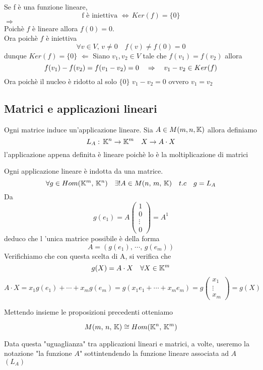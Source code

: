 \begin{prop} Se f è una funzione lineare, $$ \text{f è iniettiva }\Leftrightarrow \, Ker (f)=\{ 0 \}$$
\proof $\Rightarrow $ \\ 
Poich\`e $f$ \`e lineare allora $ f(0)= 0 $.\\
Ora poich\`e $f$ \`e   iniettiva 
$$\forall v \in V, \, v \neq 0 \quad f(v)\neq f(0)= 0$$ 
dunque $Ker(f) = \{ 0 \}$ 
$\Leftarrow $ Siano $v_1, v_2 \in V $ tale che $f(v_1)=f(v_2)$ allora 
$$ f(v_1) - f(v_2)=f(v_1-v_2)=0 \quad \Rightarrow \quad v_1-v_2 \in Ker (f)$$
Ora poich\`e il nucleo \`e ridotto al solo $\{0\}$ $v_1-v_2=0 $ ovvero $v_1=v_2$
\endproof
\end{prop}

\subsection{Matrici e applicazioni lineari}\label{Matrici_Come_Lineari}
\begin{prop}
Ogni matrice induce un'applicazione lineare.
\proof
Sia $ A \in M(m,n,\mathbb{K} ) $ allora definiamo 
$$ L_A:\, \mathbb{K} ^ n \to \mathbb{K} ^  m \quad X \to A \cdot X $$ 
l'applicazione appena definita \`e lineare poich\`e lo \`e la moltiplicazione di matrici 
\endproof
\end{prop}

\begin{prop} Ogni applicazione lineare \`e indotta da una matrice. 
$$ \forall g \in Hom ( \mathbb{K}^ m , \, \mathbb{K} ^ n  ) \quad \exists ! A \in M( n,\, m ,\, \mathbb{K} ) \quad t.c \quad g=L_A$$
\proof
Da 
$$ g(e_1) = A \begin{pmatrix}
1 \\ 0 \\ \vdots \\ 0 
\end{pmatrix} = A^1 $$ 
deduco che l 'unica matrice possibile \`e  della forma 
 $$ A = ( g( e_1 ) , \, \cdots , \, g ( e_m )) $$
 Verifichiamo che con questa scelta di A, si verifica che $$ g(X)= A \cdot X  \quad \forall X \in \mathbb{K} ^ m $$
 $$ A \cdot X = x_1 g( e_1 ) + \cdots + x_m g( e_m ) = g ( x_1 e_1 + \cdots + x_m e_m ) = g \begin{pmatrix}
 x_1 \\ \vdots \\ x_m 
 \end{pmatrix}= g(X)
 $$ 
 \endproof
\end{prop}
Mettendo insieme le proposizioni precedenti otteniamo
\begin{prop} $$ M ( m ,\, n ,\, \mathbb{K} ) \cong Hom ( \mathbb{K} ^ n , \, \mathbb{K} ^ m ) $$ 
\end{prop}
Data questa "uguaglianza" tra applicazioni lineari e matrici, a volte, useremo la notazione "la funzione $A$" sottintendendo la funzione lineare associata ad $A$ $(L_A)$
\newpage

